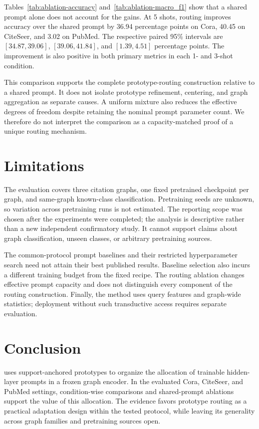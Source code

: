 Tables~\ref{tab:ablation-accuracy} and~\ref{tab:ablation-macro_f1} show that a shared prompt alone does not account for the gains. At 5 shots, routing improves accuracy over the shared prompt by 36.94 percentage points on Cora, 40.45 on CiteSeer, and 3.02 on PubMed. The respective paired 95\% intervals are $[34.87,39.06]$, $[39.06,41.84]$, and $[1.39,4.51]$ percentage points. The improvement is also positive in both primary metrics in each 1- and 3-shot condition.

This comparison supports the complete prototype-routing construction relative to a shared prompt. It does not isolate prototype refinement, centering, and graph aggregation as separate causes. A uniform mixture also reduces the effective degrees of freedom despite retaining the nominal prompt parameter count. We therefore do not interpret the comparison as a capacity-matched proof of a unique routing mechanism.

\section{Limitations}
The evaluation covers three citation graphs, one fixed pretrained checkpoint per graph, and same-graph known-class classification. Pretraining seeds are unknown, so variation across pretraining runs is not estimated. The reporting scope was chosen after the experiments were completed; the analysis is descriptive rather than a new independent confirmatory study. It cannot support claims about graph classification, unseen classes, or arbitrary pretraining sources.

The common-protocol prompt baselines and their restricted hyperparameter search need not attain their best published results. Baseline selection also incurs a different training budget from the fixed \method{} recipe. The routing ablation changes effective prompt capacity and does not distinguish every component of the routing construction. Finally, the method uses query features and graph-wide statistics; deployment without such transductive access requires separate evaluation.

\section{Conclusion}
\method{} uses support-anchored prototypes to organize the allocation of trainable hidden-layer prompts in a frozen graph encoder. In the evaluated Cora, CiteSeer, and PubMed settings, condition-wise comparisons and shared-prompt ablations support the value of this allocation. The evidence favors prototype routing as a practical adaptation design within the tested protocol, while leaving its generality across graph families and pretraining sources open.

